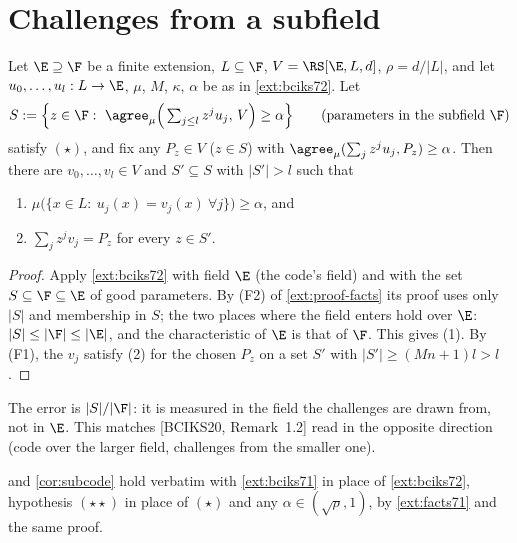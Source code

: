 \section{Challenges from a subfield}

\setcounter{lemma}{5}\begin{lemma}\label{lem:subfield}
Let $\E\supseteq\F$ be a finite extension, $L\subseteq\F$, $V=\RS[\E,L,d]$,
$\rho=d/|L|$, and let $u_0,\dots,u_l:L\to\E$, $\mu$, $M$, $\kappa$, $\alpha$ be as in
\cref{ext:bciks72}. Let
\[
S:=\Big\{z\in\F:\ \agree_\mu\Big(\textstyle\sum_{j\le l}z^ju_j,\,V\Big)\ge\alpha\Big\}
\qquad(\text{parameters in the subfield }\F)
\]
satisfy $(\star)$, and fix any $P_z\in V$ ($z\in S$) with
$\agree_\mu(\sum_jz^ju_j,P_z)\ge\alpha$. Then there are $v_0,\dots,v_l\in V$ and
$S'\subseteq S$ with $|S'|>l$ such that
\begin{enumerate}
\item $\mu\big(\{x\in L:\ u_j(x)=v_j(x)\ \forall j\}\big)\ge\alpha$, and
\item $\sum_jz^jv_j=P_z$ for every $z\in S'$.
\end{enumerate}
\end{lemma}

\begin{proof}
Apply \cref{ext:bciks72} with field $\E$ (the code's field) and with the set
$S\subseteq\F\subseteq\E$ of good parameters. By (F2) of \cref{ext:proof-facts} its proof
uses only $|S|$ and membership in $S$; the two places where the field enters hold over
$\E$: $|S|\le|\F|\le|\E|$, and the characteristic of $\E$ is that of $\F$. This gives (1).
By (F1), the $v_j$ satisfy (2) for the chosen $P_z$ on a set $S'$ with
$|S'|\ge(Mn+1)l>l$.
\end{proof}

\begin{remark}
The error is $|S|/|\F|$: it is measured in the field the challenges are drawn from, not in
$\E$. This matches [BCIKS20, Remark~1.2] read in the opposite direction (code over the
larger field, challenges from the smaller one).
\end{remark}

\begin{remark}\label{rem:subfield71}
 and \cref{cor:subcode} hold verbatim with \cref{ext:bciks71} in place of
\cref{ext:bciks72}, hypothesis $(\star\star)$ in place of $(\star)$ and any
$\alpha\in(\sqrt\rho,1)$, by \cref{ext:facts71} and the same proof.
\end{remark}
